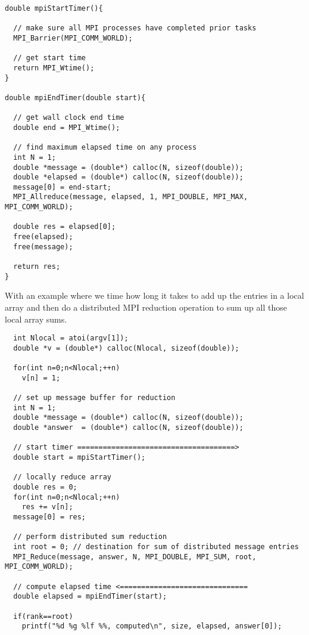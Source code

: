 \begin{verbatim}
double mpiStartTimer(){

  // make sure all MPI processes have completed prior tasks                                                                                                             
  MPI_Barrier(MPI_COMM_WORLD);

  // get start time                                                                                                                                                     
  return MPI_Wtime();
}

double mpiEndTimer(double start){

  // get wall clock end time                                                                                                                                            
  double end = MPI_Wtime();

  // find maximum elapsed time on any process                                                                                                                           
  int N = 1;
  double *message = (double*) calloc(N, sizeof(double));
  double *elapsed = (double*) calloc(N, sizeof(double));
  message[0] = end-start;
  MPI_Allreduce(message, elapsed, 1, MPI_DOUBLE, MPI_MAX, MPI_COMM_WORLD);

  double res = elapsed[0];
  free(elapsed);
  free(message);

  return res;
}
\end{verbatim}

With an example where we time how long it takes to add up the entries in a local array and then do a distributed MPI reduction operation to sum up all those local array sums.
\begin{verbatim}
  int Nlocal = atoi(argv[1]);
  double *v = (double*) calloc(Nlocal, sizeof(double));

  for(int n=0;n<Nlocal;++n)
    v[n] = 1;

  // set up message buffer for reduction  
  int N = 1;
  double *message = (double*) calloc(N, sizeof(double));
  double *answer  = (double*) calloc(N, sizeof(double));

  // start timer =====================================> 
  double start = mpiStartTimer();

  // locally reduce array          
  double res = 0;
  for(int n=0;n<Nlocal;++n)
    res += v[n];
  message[0] = res;

  // perform distributed sum reduction   
  int root = 0; // destination for sum of distributed message entries                                                                           
  MPI_Reduce(message, answer, N, MPI_DOUBLE, MPI_SUM, root, MPI_COMM_WORLD);

  // compute elapsed time <==============================
  double elapsed = mpiEndTimer(start);

  if(rank==root)
    printf("%d %g %lf %%, computed\n", size, elapsed, answer[0]);
\end{verbatim}


